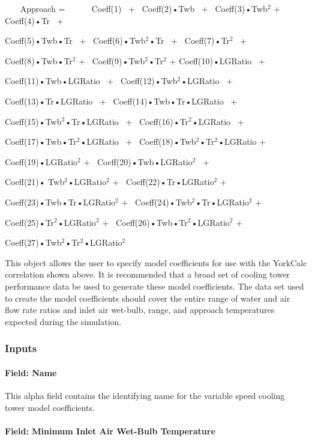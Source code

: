 ~~~ Approach = ~~~~~ Coeff(1)~ +~ Coeff(2)•Twb~ +~ Coeff(3)•Twb\(^{2}\) +~ Coeff(4)•Tr~ +

Coeff(5)•Twb•Tr~ +~ Coeff(6)•Twb\(^{2}\)•Tr~ +~ Coeff(7)•Tr\(^{2}\)~ +

Coeff(8)•Twb•Tr\(^{2}\) +~ Coeff(9)•Twb\(^{2}\)•Tr\(^{2}\) + Coeff(10)•LGRatio~ +

Coeff(11)•Twb•LGRatio~ +~ Coeff(12)•Twb\(^{2}\)•LGRatio~ +

Coeff(13)•Tr•LGRatio~ +~ Coeff(14)•Twb•Tr•LGRatio~ +

Coeff(15)•Twb\(^{2}\)•Tr•LGRatio~ +~ Coeff(16)•Tr\(^{2}\)•LGRatio~ +

Coeff(17)•Twb•Tr\(^{2}\)•LGRatio~ +~ Coeff(18)•Twb\(^{2}\)•Tr\(^{2}\)•LGRatio +

Coeff(19)•LGRatio\(^{2}\) +~ Coeff(20)•Twb•LGRatio\(^{2}\)~ +

Coeff(21)• Twb\(^{2}\)•LGRatio\(^{2}\) +~ Coeff(22)•Tr•LGRatio\(^{2}\) +

Coeff(23)•Twb•Tr•LGRatio\(^{2}\) +~ Coeff(24)•Twb\(^{2}\)•Tr•LGRatio\(^{2}\) +

Coeff(25)•Tr\(^{2}\)•LGRatio\(^{2}\) +~ Coeff(26)•Twb•Tr\(^{2}\)•LGRatio\(^{2}\) +

Coeff(27)•Twb\(^{2}\)•Tr\(^{2}\)•LGRatio\(^{2}\)

This object allows the user to specify model coefficients for use with the YorkCalc correlation shown above. It is recommended that a broad set of cooling tower performance data be used to generate these model coefficients. The data set used to create the model coefficients should cover the entire range of water and air flow rate ratios and inlet air wet-bulb, range, and approach temperatures expected during the simulation.

\subsubsection{Inputs}\label{inputs-5-005}

\paragraph{Field: Name}\label{field-name-4-005}

This alpha field contains the identifying name for the variable speed cooling tower model coefficients.

\paragraph{Field: Minimum Inlet Air Wet-Bulb Temperature}\label{field-minimum-inlet-air-wet-bulb-temperature-1}

